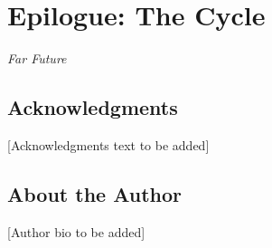 \documentclass[12pt,twoside,openright]{book}
\begin{document}

\part{Epilogue: The Cycle}
\label{part:epilogue}

\begin{center}
\itshape
Far Future
\end{center}

\cleardoublepage




\backmatter

\chapter*{Acknowledgments}

[Acknowledgments text to be added]

\cleardoublepage

\chapter*{About the Author}

[Author bio to be added]

\end{document}
